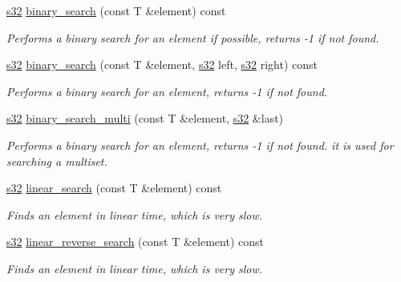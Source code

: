 \begin{DoxyCompactItemize}
\hyperlink{namespaceirr_ac66849b7a6ed16e30ebede579f9b47c6}{s32} \hyperlink{classirr_1_1core_1_1array_aec40f807c683671067d52e83d7b72a82}{binary\+\_\+search} (const T \&element) const
\begin{DoxyCompactList}\small\item\em Performs a binary search for an element if possible, returns -\/1 if not found. \end{DoxyCompactList}\item 
\hyperlink{namespaceirr_ac66849b7a6ed16e30ebede579f9b47c6}{s32} \hyperlink{classirr_1_1core_1_1array_a9f3d6ee26c52d2e231446e4069a765a3}{binary\+\_\+search} (const T \&element, \hyperlink{namespaceirr_ac66849b7a6ed16e30ebede579f9b47c6}{s32} left, \hyperlink{namespaceirr_ac66849b7a6ed16e30ebede579f9b47c6}{s32} right) const
\begin{DoxyCompactList}\small\item\em Performs a binary search for an element, returns -\/1 if not found. \end{DoxyCompactList}\item 
\hyperlink{namespaceirr_ac66849b7a6ed16e30ebede579f9b47c6}{s32} \hyperlink{classirr_1_1core_1_1array_a62821cac92125dd76f96f21e60ca94a4}{binary\+\_\+search\+\_\+multi} (const T \&element, \hyperlink{namespaceirr_ac66849b7a6ed16e30ebede579f9b47c6}{s32} \&last)
\begin{DoxyCompactList}\small\item\em Performs a binary search for an element, returns -\/1 if not found. it is used for searching a multiset. \end{DoxyCompactList}\item 
\hyperlink{namespaceirr_ac66849b7a6ed16e30ebede579f9b47c6}{s32} \hyperlink{classirr_1_1core_1_1array_a4b5002b36bb913a3680f2412ab2ee045}{linear\+\_\+search} (const T \&element) const
\begin{DoxyCompactList}\small\item\em Finds an element in linear time, which is very slow. \end{DoxyCompactList}\item 
\hyperlink{namespaceirr_ac66849b7a6ed16e30ebede579f9b47c6}{s32} \hyperlink{classirr_1_1core_1_1array_aef6726fc4de8ca5a01881e09664981ad}{linear\+\_\+reverse\+\_\+search} (const T \&element) const
\begin{DoxyCompactList}\small\item\em Finds an element in linear time, which is very slow. \end{DoxyCompactList}\item 

\end{DoxyCompactItemize}
